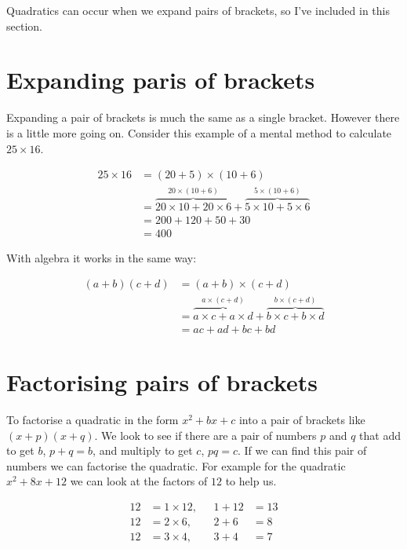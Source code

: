 \documentclass[
  a4paper,
]{scrbook}
\begin{document}
Quadratics can occur when we expand pairs of brackets, so I've included
in this section.

\hypertarget{expanding-paris-of-brackets}{%
\section{Expanding paris of
brackets}\label{expanding-paris-of-brackets}}

Expanding a pair of brackets is much the same as a single bracket.
However there is a little more going on. Consider this example of a
mental method to calculate \(25 \times 16\).

\[
\begin{aligned} 25 \times 16 &= (20 + 5) \times (10 + 6) \\
&= \overbrace{20 \times 10 + 20 \times 6}^{20 \times (10 + 6)} + \overbrace{5 \times 10 + 5 \times 6}^{5 \times (10 + 6)}\\
&= 200 + 120 + 50 + 30 \\
&= 400
\end{aligned}
\]

With algebra it works in the same way:

\[
\begin{aligned} (a+b)(c+d) &= (a+b) \times (c+d) \\
&= \overbrace{a \times c + a \times d}^{a \times (c+d)} + \overbrace{b \times c + b \times d}^{b \times (c+d)}\\
&= ac + ad + bc + bd
\end{aligned}
\]

\hypertarget{factorising-pairs-of-brackets}{%
\section{Factorising pairs of
brackets}\label{factorising-pairs-of-brackets}}

To factorise a quadratic in the form \(x^2 +bx +c\) into a pair of
brackets like \((x+p)(x+q)\). We look to see if there are a pair of
numbers \(p\) and \(q\) that add to get \(b\), \(p+q = b\), and multiply
to get \(c\), \(pq=c\). If we can find this pair of numbers we can
factorise the quadratic. For example for the quadratic \(x^2 + 8x +12\)
we can look at the factors of \(12\) to help us.

\[
\begin{aligned} 12 &= 1 \times 12, &\ \  \  1+12 &= 13\\
12 &= 2 \times 6, &\ \  \  2+6 &= 8\\
12 &= 3 \times 4, &\ \  \  3+4 &= 7\\
\end{aligned}
\]
\end{document}
